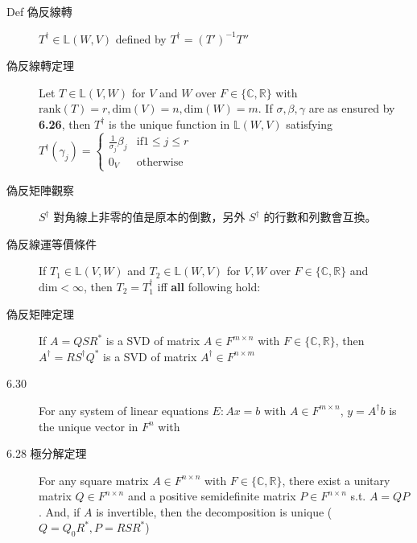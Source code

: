 \documentclass[8pt, twocolumn]{extarticle}
\newcommand{\vsdim}{\ensuremath{\text{dim}}}
\newcommand{\rank}{\ensuremath{\text{rank}}}
\newcommand{\realnum}{\mathbb{R}}
\newcommand{\complexnum}{\mathbb{C}}
\newcommand{\ltrans}{\mathbb{L}}
\begin{document}
\begin{description}
        
    \item[Def 偽反線轉] $T^\dagger \in \ltrans(W, V)$ defined by $T^\dagger = (T')^{-1}T''$
    \item[偽反線轉定理] Let $T \in \ltrans(V,W)$ for $V$ and $W$ over $F \in \{\complexnum, \realnum\}$ with $\rank(T)=r, \vsdim(V)=n,\vsdim(W)=m$. If $\sigma, \beta, \gamma$ are as ensured by \textbf{6.26}, then $T^\dagger$ is the unique function in $\ltrans(W, V)$ satisfying $T^\dagger(\gamma_j)=\left\{\begin{array}{cl} \frac{1}{\sigma_j}\beta_j & \text{if} 1 \leq j \leq r\\ 0_V & \text{otherwise}\end{array}\right.$
	\item[偽反矩陣觀察] $S^\dagger$ 對角線上非零的值是原本的倒數，另外 $S^\dagger$ 的行數和列數會互換。
    \item[偽反線運等價條件] If $T_1 \in \ltrans(V, W)$ and $T_2 \in \ltrans(W, V)$ for $V, W$ over $F \in \{\complexnum, \realnum\}$ and $\vsdim < \infty$, then $T_2 = T_1^\dagger$ iff \textbf{all} following hold:
    \item[偽反矩陣定理] If $A = QSR^*$ is a SVD of matrix $A \in F^{m\times n}$ with $F \in \{\complexnum, \realnum\}$, then $A^\dagger = RS^\dagger Q^*$ is a SVD of matrix $A^\dagger \in F^{n\times m}$
    \item[6.30] For any system of linear equations $E: Ax = b$ with $A \in F^{m\times n}$, $y = A^\dagger b$ is the unique vector in $F^n$ with 
    \item[6.28 極分解定理] For any square matrix $A \in F^{n\times n}$ with $F \in \{\complexnum, \realnum\}$, there exist a unitary matrix $Q \in F^{n\times n}$ and a positive semidefinite matrix $P \in F^{n\times n}$ s.t. $A = QP$. And, if $A$ is invertible, then the decomposition is unique ($Q = Q_0R^*, P = RSR^*$)

\end{description}
\end{document}
